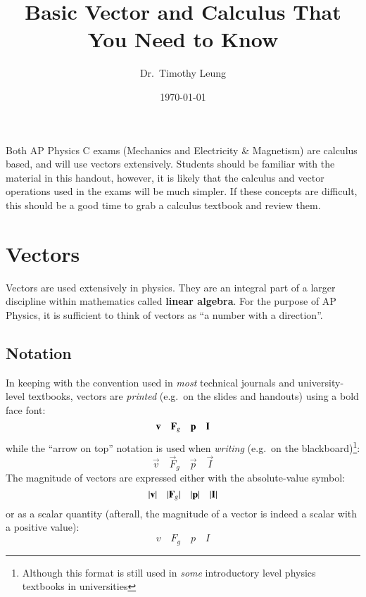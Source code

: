 \documentclass{../../oss-handout}
\title{Basic Vector and Calculus That You Need to Know}
\author{Dr.\ Timothy Leung}
\date{\today}
\newcommand{\mb}[1]{\ensuremath\mathbf{#1}}
\begin{document}
\thispagestyle{title}
\gentitle


Both AP Physics C exams (Mechanics and Electricity \& Magnetism) are calculus
based, and will use vectors extensively.
Students should be familiar with the material in this handout, however, it is
likely that the calculus and vector operations used in the exams will be much
simpler. If these concepts are difficult, this should be a good time to grab a
calculus textbook and review them.

\section{Vectors}
Vectors are used extensively in physics. They are an integral part of a larger
discipline within mathematics called \textbf{linear algebra}. For the purpose
of AP Physics, it is sufficient to think of vectors as
``a number with a direction''.

\subsection{Notation}
In keeping with the convention used in \emph{most} technical journals and
university-level textbooks, vectors are \emph{printed} (e.g.\ on the slides and
handouts) using a bold face font:
\begin{equation*}
  \mb{v}\quad\mb{F}_g\quad\mb{p}\quad\mb{I}
\end{equation*}
while the ``arrow on top'' notation is used when \emph{writing} (e.g.\ on the
blackboard)\footnote{Although this format is still used in \emph{some}
  introductory level physics textbooks in universities}:
\begin{equation*}
  \vec{v}\quad\vec{F}_g\quad\vec{p}\quad\vec{I}
\end{equation*}
The magnitude of vectors are expressed either with the absolute-value symbol:
\begin{equation*}
  |\mb{v}|\quad|\mb{F}_g|\quad|\mb{p}|\quad|\mb{I}|
\end{equation*}
or as a scalar quantity (afterall, the magnitude of a vector is indeed a scalar
with a positive value):
\begin{equation*}
  v\quad F_g\quad p \quad I
\end{equation*}
\end{document}
